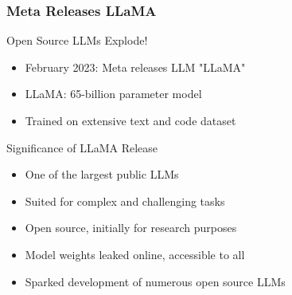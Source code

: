 \begin{frame}[fragile]\frametitle{Meta Releases LLaMA}

Open Source LLMs Explode!
 
    \begin{itemize}
        \item February 2023: Meta releases LLM "LLaMA"
        \item LLaMA: 65-billion parameter model
        \item Trained on extensive text and code dataset
    \end{itemize}
	
Significance of LLaMA Release

    \begin{itemize}
        \item One of the largest public LLMs
        \item Suited for complex and challenging tasks
        \item Open source, initially for research purposes
        \item Model weights leaked online, accessible to all
        \item Sparked development of numerous open source LLMs
    \end{itemize}
\end{frame}






